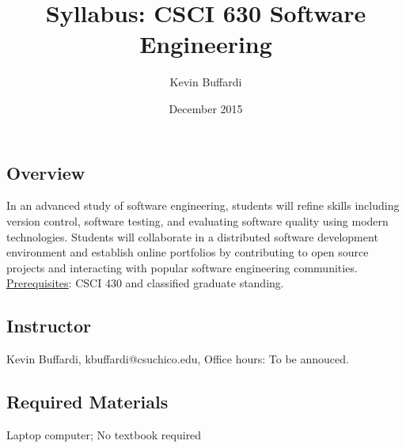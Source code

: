 \documentclass[12pt]{article}
\title{Syllabus: CSCI 630 Software Engineering}
\author{Kevin Buffardi}
\date{December 2015}
\begin{document}
  \maketitle
  \subsection*{Overview}	 
  \noindent
  In an advanced study of software engineering, students will refine skills including version control, software testing, and evaluating software quality using modern technologies. Students will collaborate in a distributed software development environment and establish online portfolios by contributing to open source projects and interacting with popular software engineering communities.
  \newline
  \underline{Prerequisites}: CSCI 430 and classified graduate standing. \\
  
  \subsection*{Instructor}
  \noindent
  Kevin Buffardi, kbuffardi@csuchico.edu, Office hours: To be annouced. \\

  \subsection*{Required Materials}
  \noindent
  Laptop computer; No textbook required
  \newline  
\end{document}
